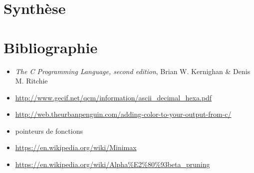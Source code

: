 \documentclass[12pt,S,fira-sans]{paper}
\begin{document}
\section*{Synthèse}

\section*{Bibliographie}

\begin{itemize}
    \item \emph{The C Programming Language, second edition}, Brian W. Kernighan \& Denis M. Ritchie
    \item \url{http://www.gecif.net/qcm/information/ascii_decimal_hexa.pdf}
    \item \url{http://web.theurbanpenguin.com/adding-color-to-your-output-from-c/}
    \item pointeurs de fonctions
    \item \url{https://en.wikipedia.org/wiki/Minimax}
    \item \url{https://en.wikipedia.org/wiki/Alpha%E2%80%93beta_pruning}
\end{itemize}
\end{document}
